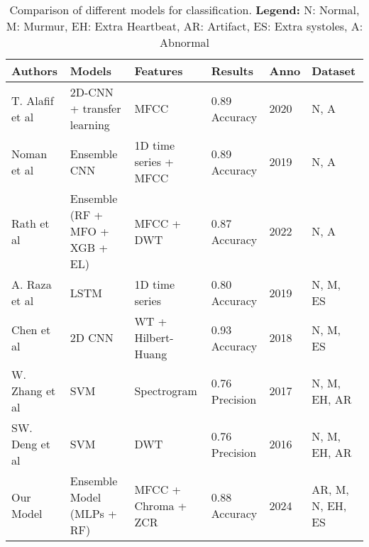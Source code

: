 \begin{table*}[ht!]
    \small
    \centering
    \begin{tabular}{|llllll|}
        \hline
        \textbf{Authors}                                                                & \textbf{Models}                & \textbf{Features}     & \textbf{Results} & \textbf{Anno} & \textbf{Dataset} \\ \hline
        T. Alafif et al \cite{Alafif_Boulares_Barnawi_Alafif_Althobaiti_Alferaidi_2020} & 2D-CNN + transfer learning     & MFCC                  & 0.89 Accuracy    & 2020          & N, A             \\ 
        Noman et al \cite{Noman_Ting_Salleh_Ombao_2019}                                 & Ensemble CNN                   & 1D time series + MFCC & 0.89 Accuracy    & 2019          & N, A             \\ 
        Rath et al \cite{Rath_Mishra_Panda_Pal_2022}                                    & Ensemble (RF + MFO + XGB + EL) & MFCC + DWT            & 0.87 Accuracy    & 2022          & N, A             \\ 
        A. Raza et al \cite{Raza_Mehmood_Ullah_Ahmad_Choi_On_2019}                      & LSTM                           & 1D time series        & 0.80 Accuracy    & 2019          & N, M, ES         \\ 
        Chen et al \cite{Chen_Ren_Hao_Hu_2018}                                          & 2D CNN                         & WT + Hilbert-Huang    & 0.93 Accuracy    & 2018          & N, M, ES         \\ 
        W. Zhang et al \cite{Zhang_Han_Deng_2017}                                       & SVM                            & Spectrogram           & 0.76 Precision   & 2017          & N, M, EH, AR     \\ 
        SW. Deng et al \cite{Deng_Han_2016}                                             & SVM                            & DWT                   & 0.76 Precision   & 2016          & N, M, EH, AR     \\ 
        Our Model                                                                       & Ensemble Model (MLPs + RF)     & MFCC + Chroma + ZCR   & 0.88 Accuracy    & 2024          & AR, M, N, EH, ES \\ \hline
    \end{tabular}
    \caption{Comparison of different models for classification. \textbf{Legend:} N: Normal, M: Murmur, EH: Extra Heartbeat, AR: Artifact, ES: Extra systoles, A: Abnormal}
\end{table*}